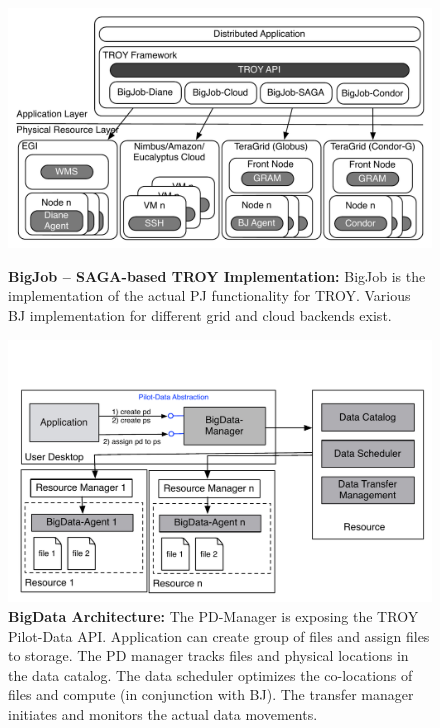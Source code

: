 \documentclass[conference,final]{IEEEtran}
\newcommand{\upp}{\vspace*{-0.5em}}
\begin{document}
\begin{figure}[t]
	\begin{minipage}[b]{0.475\linewidth}
	\centering
	\includegraphics[width=\textwidth]{figures/distributed_pilot_job.pdf}
	\caption{\textbf{BigJob -- SAGA-based TROY Implementation:} BigJob is the implementation of the actual PJ functionality for TROY. Various BJ implementation for different grid and cloud backends exist.}
	\label{fig:figures_distributed_pilot_job}
	\end{minipage}
	\hspace{0.035\linewidth}
	\begin{minipage}[b]{0.475\linewidth}
	\centering
   	\includegraphics[width=\textwidth]{figures/pilot-data-manager.pdf}
    \caption{\textbf{BigData Architecture:} The PD-Manager is exposing the
      TROY Pilot-Data API. Application can create group of files and assign 
      files to storage. The PD manager tracks files and physical locations in
      the data catalog. The data scheduler optimizes the co-locations
      of files and compute (in conjunction with BJ). The transfer
      manager initiates and monitors the actual data
      movements. \upp\upp}
	\label{fig:pilot-data-architecture}
	\end{minipage}
\end{figure}
\end{document}

